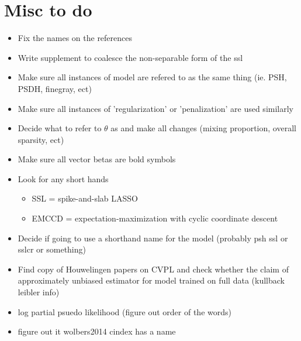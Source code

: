 \documentclass[11pt,a4paper]{article}
\begin{document}
\newpage
\section{Misc to do}
\begin{itemize}
    \item Fix the names on the references
    \item Write supplement to coalesce the non-separable form of the ssl
    \item Make sure all instances of model are refered to as the same thing (ie. PSH, PSDH, finegray, ect)
    \item Make sure all instances of 'regularization' or 'penalization' are used similarly
    \item Decide what to refer to $\theta$ as and make all changes (mixing proportion, overall sparsity, ect)
    \item Make sure all vector betas are bold symbols
    \item Look for any short hands
    \begin{itemize}
        \item SSL = spike-and-slab LASSO
        \item EMCCD = expectation-maximization with cyclic coordinate descent
    \end{itemize}
    \item Decide if going to use a shorthand name for the model (probably psh ssl or sslcr or something)
    \item Find copy of  Houwelingen papers on CVPL and check whether the claim of approximately unbiased estimator for model trained on full data (kullback leibler info)
    \item log partial psuedo likelihood (figure out order of the words)
    \item figure out it wolbers2014 cindex has a name
\end{itemize}


\newpage
\printbibliography[heading=bibintoc]
\end{document}
